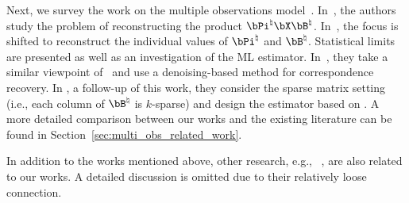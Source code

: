 \documentclass[11pt]{article}
\def \bPitrue {\bPi^{\natural}}
\def \bBtrue {\bB^{\natural}}
\begin{document}
Next, we survey the work on the multiple observations model~\citep{pananjady2017denoising, slawski2020two, zhang2022permutation, zhang2023greed, zhang2023one}.
In~\citet{pananjady2017denoising}, the authors study
the problem of
reconstructing the product $\bPitrue\bX \bBtrue$.
In~\citet{zhang2022permutation}, the focus is shifted
to reconstruct the individual values of
$\bPitrue$ and $\bBtrue$.
Statistical limits are presented as well as an investigation
of the ML estimator. In~\citet{slawski2020two},
they take a similar viewpoint of~\citet{slawski2017linear}
and use a denoising-based method for correspondence
recovery.
In \cite{zhang2023one}, a follow-up of this work, they consider the sparse matrix setting (i.e., each column of $\bBtrue$ is $k$-sparse) and design the estimator based on \citet{zhang2020optimal}.
A more detailed comparison between our works and the existing literature
can be found in Section~\ref{sec:multi_obs_related_work}.

In addition to the works mentioned above, other research, e.g.,
~\cite{haghighatshoar2018signal, tang2021low, jeong2020recovering, slawski2022permuted,fang2023regression}, are also related to our
 works. A detailed discussion is omitted due to their relatively loose connection.
\end{document}
